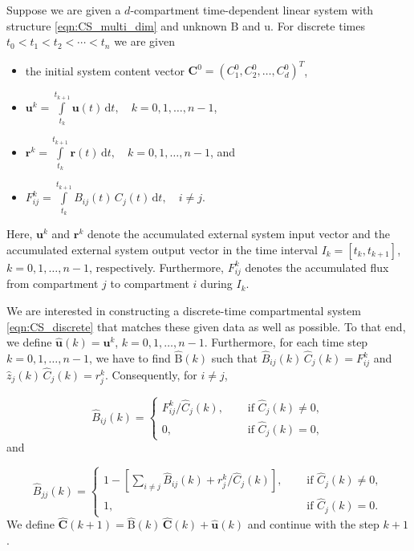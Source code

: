 \documentclass[11pt,a4paper]{article}
\renewcommand{\vec}[1]{\mathbf{#1}}
\newcommand{\tens}[1]{\mathrm{#1}}
\newcommand{\dd}[1]{\,\mathrm{d}#1}
\newcommand{\intl}{\int\limits}
\newcommand{\suml}{\sum\limits}
\begin{document}
    Suppose we are given a $d$-compartment time-dependent linear system with structure \eqref{eqn:CS_multi_dim} and unknown $\tens{B}$ and $\tens{u}$.
    For discrete times $t_0<t_1<t_2<\cdots<t_n$ we are given
    \begin{itemize}
        \item the initial system content vector $\vec{C}^0=(C^0_1,C^0_2,\ldots,C^0_d)^T$,
        \item $\vec{u}^k = \intl_{t_k}^{t_{k+1}} \vec{u}(t)\dd{t},\quad k=0,1,\ldots,n-1$, 
        \item $\vec{r}^k = \intl_{t_k}^{t_{k+1}} \vec{r}(t)\dd{t},\quad k=0,1,\ldots,n-1$, and
        \item $F_{ij}^k = \intl_{t_k}^{t_{k+1}} B_{ij}(t)\,C_j(t)\dd{t},\quad i\neq j$.
    \end{itemize}
    Here, $\vec{u}^k$ and $\vec{r}^k$ denote the accumulated external system input vector and the accumulated external system output vector in the time interval $I_k=[t_k,t_{k+1}]$, $k=0,1,\ldots,n-1$, respectively.
    Furthermore, $F^k_{ij}$ denotes the accumulated flux from compartment $j$ to compartment $i$ during $I_k$.

    We are interested in constructing a discrete-time compartmental system \eqref{eqn:CS_discrete} that matches these given data as well as possible.
    To that end, we define $\widehat{\vec{u}}(k)=\vec{u}^k$, $k=0,1,\ldots,n-1$.
    Furthermore, for each time step $k=0,1,\ldots,n-1$, we have to find $\widehat{\tens{B}}(k)$ such that $\widehat{B}_{ij}(k)\,\widehat{C}_j(k)=F^k_{ij}$ and $\widehat{z}_j(k)\,\widehat{C}_j(k)=r^k_j$.
    Consequently, for $i\neq j$,
    
    \begin{equation*}
        \widehat{B}_{ij}(k) =
        \begin{cases}
            F^k_{ij} / \widehat{C}_j(k),\quad&\text{ if }\widehat{C}_j(k)\neq0,\\
            0, &\text{ if }\widehat{C}_j(k)=0,
        \end{cases}
    \end{equation*}
    and
    
    \begin{equation*}
        \widehat{B}_{jj}(k) = 
        \begin{cases}
            1-\left[\suml_{i\neq j}\widehat{B}_{ij}(k)+r^k_j/\widehat{C}_j(k)\right],\quad &\text{ if }\widehat{C}_j(k)\neq0,\\
            1, &\text{ if }\widehat{C}_j(k)=0.
        \end{cases}
    \end{equation*}
    We define $\widehat{\vec{C}}(k+1)=\widehat{\tens{B}}(k)\,\widehat{\vec{C}}(k)+\widehat{\vec{u}}(k)$ and continue with the step $k+1$.
    
\end{document}
